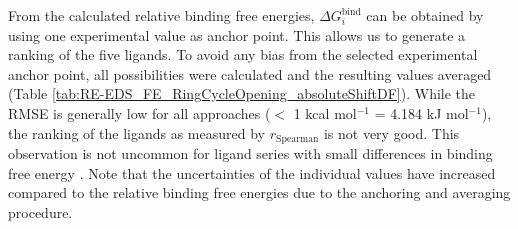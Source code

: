 From the calculated relative binding free energies, $\Delta G_{i}^{\text{bind}}$ can be obtained by using one experimental value as anchor point. This allows us to generate a ranking of the five ligands. To avoid any bias from the selected experimental anchor point, all possibilities were calculated and the resulting values averaged (Table \ref{tab:RE-EDS_FE_RingCycleOpening_absoluteShiftDF}). While the RMSE is generally low for all approaches ($<$ 1 kcal mol$^{-1}$ = 4.184 kJ mol$^{-1}$), the ranking of the ligands as measured by $r_{\text{Spearman}}$ is not very good. 
This observation is not uncommon for ligand series with small differences in binding free energy \cite{Wang2015,Schindler2020}.
Note that the uncertainties of the individual values have increased compared to the relative binding free energies due to the anchoring and averaging procedure.

